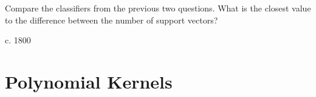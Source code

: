 \documentclass[answers]{exam}
\begin{document}
\begin{questions}
\question Compare the classifiers from the previous two questions. What is the 
closest value to the difference between the number of support vectors?

\begin{solution}
c. 1800
\end{solution}
\end{questions}

\section*{Polynomial Kernels}
\end{document}
